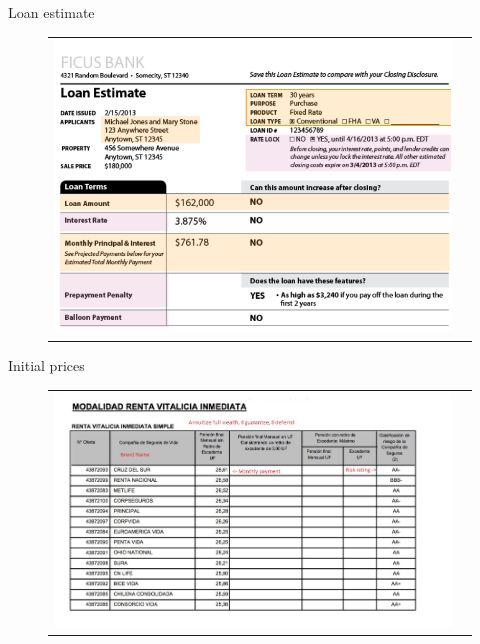 \documentclass[10pt,aspectratio=169]{beamer}
\begin{document}
\begin{frame}{Loan estimate}\label{slide:fig_LE}    
\begin{figure}[H]
\centering{}%
\begin{tabular}{cc}
\includegraphics[scale=0.42]{../figures/docs_screenshots/Loan Estimate_cut.png}
\end{tabular}
\end{figure}
\hyperlink{slide:motivation}{}
\end{frame}





\begin{frame}{Initial prices}\label{slide:fig_offer_certificate}    
\begin{figure}[H]
\centering{}%
\begin{tabular}{cc}
\includegraphics[scale=0.49]{../figures/docs_screenshots/annuity_offer.png}
\end{tabular}
\end{figure}
\hyperlink{slide:setting2}{} 
\hyperlink{slide:data}{}
\end{frame}
\end{document}

